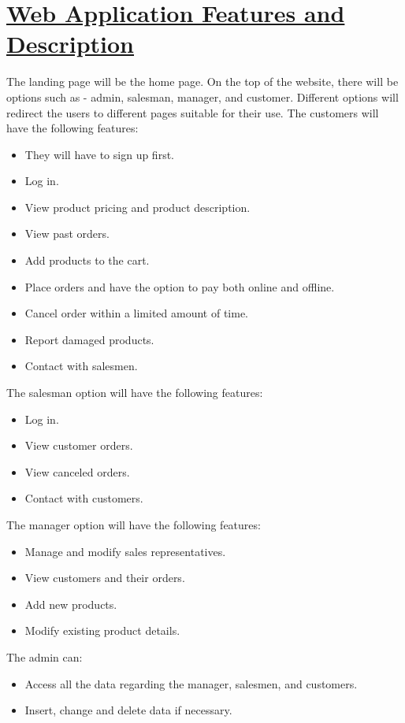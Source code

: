 \documentclass{article}
\begin{document}
\section*{\underline{Web Application Features and Description}}

The landing page will be the home page. On the top of the website, there will be options such as - admin, salesman, manager, and customer. Different options will redirect the users to different pages suitable for their use. The customers will have the following features:

\begin{itemize}
    \item They will have to sign up first.
    \item Log in.
    \item View product pricing and product description.
    \item View past orders.
    \item Add products to the cart.
    \item Place orders and have the option to pay both online and offline.
    \item Cancel order within a limited amount of time.
    \item Report damaged products.
    \item Contact with salesmen.
\end{itemize}
The salesman option will have the following features:

\begin{itemize}
    \item Log in.
    \item View customer orders.
    \item View canceled orders.
    \item Contact with customers.
\end{itemize}
The manager option will have the following features:

\begin{itemize}
    \item Manage and modify sales representatives.
    \item View customers and their orders.
    \item Add new products.
    \item Modify existing product details.
\end{itemize}
The admin can: 

\begin{itemize}
    \item Access all the data regarding the manager, salesmen, and customers.
    \item Insert, change and delete data if necessary.
\end{itemize}
\end{document}
